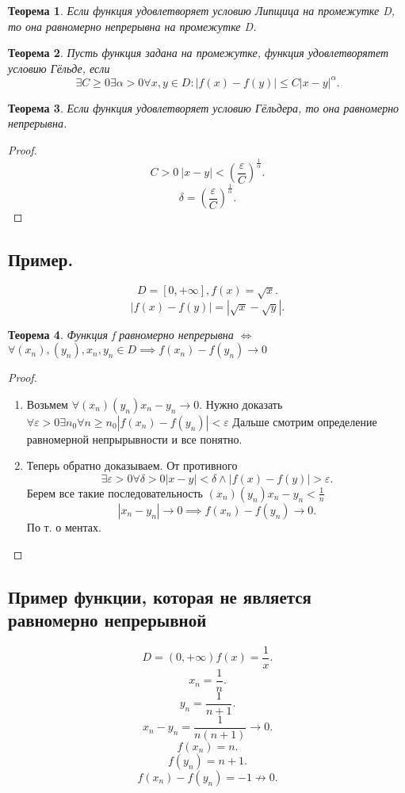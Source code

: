 \documentclass{scrartcl}
\newtheorem{theorem}{Теорема}
\begin{document}
    \begin{theorem}
        Если функция удовлетворяет условию Липщица на промежутке D, то она равномерно
        непрерывна на промежутке D.
    \end{theorem}
    \begin{theorem}
        Пусть функция задана на промежутке, функция удовлетворятет условию Гёльде, 
        если
        \[
        \exists  C \ge  0 \exists  \alpha > 0 \forall  x, y \in D : |f(x)-f(y)|\le  C|x - y|^{\alpha}
        .\] 
    \end{theorem}
    \begin{theorem}
        Если функция удовлетворяет условию Гёльдера, то она равномерно непрерывна.
    \end{theorem}
    \begin{proof}
        \[
        C > 0 ~  |x - y| < (\frac{\varepsilon}{C})^{\frac{1}{\alpha}}
        .\] 
        \[
        \delta = (\frac{\varepsilon}{C})^{\frac{1}{\alpha}}
        .\] 
    \end{proof}
     \subsection{Пример.}
     \[
         D = [0,+\infty] , f(x) = \sqrt{x} 
     .\] 
     \[
     |f(x) - f(y)| = |\sqrt{x}  - \sqrt{y} |
     .\] 
     \begin{theorem}
         Функция f равномерно непрерывна $\iff$ $\forall  (x_{n}), (y_{n}), x_{n}, y_{n} \in D 
         \implies f(x_{n}) - f(y_{n}) \to 0$
     \end{theorem}
     \begin{proof}
         \begin{enumerate}
             \item 
                 Возьмем $\forall (x_{n}) (y_{n}) x_{n} - y_{n} \to 0$.
                 Нужно доказать $\forall \varepsilon >0 \exists  n_0 \forall  n\ge n_0
                 |f(x_{n}) - f(y_{n})| < \varepsilon$
                 Дальше смотрим определение равномерной непрырывности и все понятно.
            \item
                Теперь обратно доказываем. От противного
                \[
                \exists  \varepsilon > 0 \forall \delta > 0 |x - y| < \delta \land |f(x) - f(y)| > \varepsilon
                .\] 
                Берем все такие последовательность $(x_{n}) (y_{n}) x_{n} - y_{n} < \frac{1}{n}$ 
                \[
                |x_{n} - y_{n}| \to 0 \implies f(x_{n}) - f(y_{n}) \to 0
                .\] 
                По т. о ментах.
         \end{enumerate}
     \end{proof}
     \subsection{Пример функции, которая не является равномерно непрерывной}
     \[
     D = (0,+\infty) f(x) = \frac{1}{x}
     .\] 
     \[
     x_{n} = \frac{1}{n}
     .\] 
     \[
     y_{n} = \frac{1}{n + 1}
     .\] 
     \[
     x_{n} - y_{n}= \frac{1}{n(n + 1)} \to 0
     .\] 
     \[
     f(x_{n}) = n
     .\] 
     \[
     f(y_{n}) = n + 1
     .\] 
     \[
     f(x_{n}) - f(y_{n}) = -1 \not \to 0
     .\] 
\end{document}
